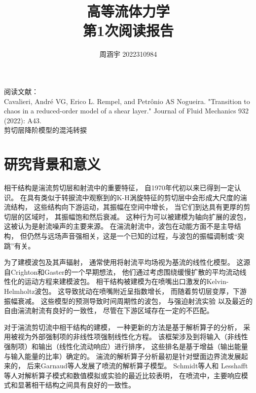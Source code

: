\documentclass[UTF8,zihao=5]{ctexart} %
\title{{\bfseries\rmfamily\Huge{高等流体力学\hspace{1em}\\第1次阅读报告}}}
\author{周涵宇 2022310984}
\date{}
\begin{document}
\maketitle
\thispagestyle{fancy}



阅读文献：\\
Cavalieri, André VG, Erico L. Rempel, and Petrônio AS Nogueira. "Transition to chaos in a reduced-order model of a shear layer." Journal of Fluid Mechanics 932 (2022): A43.
\\
剪切层降阶模型的混沌转捩


\section{研究背景和意义}
相干结构是湍流剪切层和射流中的重要特征，
自1970年代初以来已得到一定认识。
在具有类似于转捩流中观察到的K-H涡旋特征的剪切层中会形成大尺度的湍流结构，
这些结构向下游运动，其振幅在空间中增长，
当它们到达具有更厚的剪切层的区域时，
其振幅饱和然后衰减。
这种行为可以被建模为轴向扩展的波包，
这被认为是射流噪声的主要来源。
在湍流射流中，波包在动能方面不是主导结构，
但仍然与远场声音强相关，这是一个已知的过程，与波包的振幅调制或“突跳”有关。

为了建模波包及其声辐射，
通常使用将射流平均场视为基流的线性化模型。
这源自Crighton和Gaster\cite{crighton1976stability}的一个早期想法，
他们通过考虑围绕缓慢扩散的平均流动线性化的运动方程来建模波包。
相干结构被建模为在喷嘴出口激发的Kelvin-Helmholtz波包。
这导致扰动在喷嘴附近呈指数增长，
而随着剪切层变厚，下游振幅衰减。
这些模型的预测导致时间周期性的波包，
与强迫射流实验\cite{cohen1987evolution}
以及最近的自由湍流射流\cite{cavalieri2013wavepackets}有良好的一致性，
尽管在下游区域存在一定的不匹配。

对于湍流剪切流中相干结构的建模，
一种更新的方法是基于解析算子的分析，
采用被视为外部强制项的非线性项强制线性化方程。
该框架涉及到将输入（非线性强制项）和输出（线性化流动响应）进行排序，
这些排名是基于增益（输出能量与输入能量的比率）确定的。
湍流的解析算子分析最初是针对壁面边界流发展起来的，
后来Garnaud等人\cite{garnaud2013preferred}发展了喷流的解析算子模型。
Schmidt\cite{schmidt2018spectral}等人和
Lesshafft\cite{lesshafft2019resolvent}等人对解析算子模式和数值模拟或实验的最近比较表明，
在喷流中，主要响应模式和显著相干结构之间具有良好的一致性。
\end{document}

